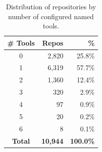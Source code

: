 \begin{table}[t]
\centering
\caption{Distribution of repositories by number of configured named tools.}
\label{tab:tool-count-distribution}
\begin{tabular}{crr}
\toprule
\textbf{\# Tools} & \textbf{Repos} & \textbf{\%} \\
\midrule
0 & 2,820 & 25.8\% \\
1 & 6,319 & 57.7\% \\
2 & 1,360 & 12.4\% \\
3 & 320 & 2.9\% \\
4 & 97 & 0.9\% \\
5 & 20 & 0.2\% \\
6 & 8 & 0.1\% \\
\midrule
\textbf{Total} & \textbf{10,944} & \textbf{100.0\%} \\
\bottomrule
\end{tabular}
\end{table}
